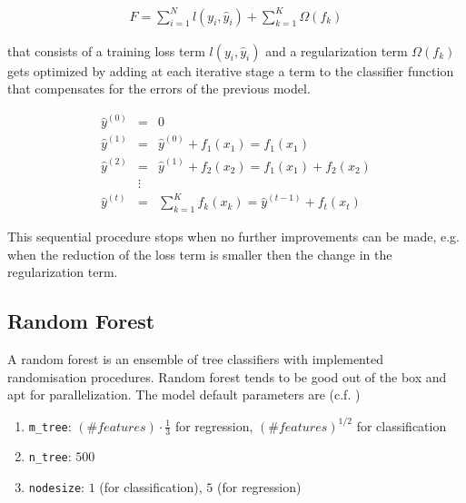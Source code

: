 \documentclass[a4paper,12pt]{article}
\begin{document}
\begin{eqnarray*}
F = \displaystyle\sum_{i=1}^{N} l(y_i, \hat{y}_i) + \displaystyle\sum_{k=1}^{K} \Omega(f_k) 
\end{eqnarray*}

that consists of a training loss term $l(y_i,\hat{y}_i)$ and a regularization term $\Omega(f_k)$ gets optimized by adding at each iterative stage a term to the classifier function that compensates for the errors of the previous model. 

\begin{eqnarray*}
\hat{y}^{(0)} &=& 0       \\
\hat{y}^{(1)} &=& \hat{y}^{(0)} + f_1(x_1) =  f_1(x_1)   \\
\hat{y}^{(2)} &=& \hat{y}^{(1)}+f_2(x_2) = f_1(x_1) + f_2(x_2) \\
&\vdots& \\
\hat{y}^{(t)} &=& \displaystyle\sum_{k=1}^{K} f_k(x_k) = \hat{y}^{(t-1)} + f_t(x_t)
\end{eqnarray*}

This sequential procedure stops when no further improvements can be made, e.g. when the reduction of the loss term is smaller then the change in the regularization term. \\

\subsection{Random Forest}
A random forest is an ensemble of tree classifiers with implemented
randomisation procedures.
Random forest tends to be good out of the box and apt for parallelization.
The model default parameters are (c.f. \cite{breiman2001random})
\begin{enumerate}
\item \texttt{m\_tree}:  $(\#features) \cdot \frac{1}{3} $ for regression,
$ (\#features)^{1/2}$ for classification
\item \texttt{n\_tree}:  $500$
\item \texttt{nodesize}: $1$ (for classification), $5$ (for regression)
\end{enumerate}
\end{document}
